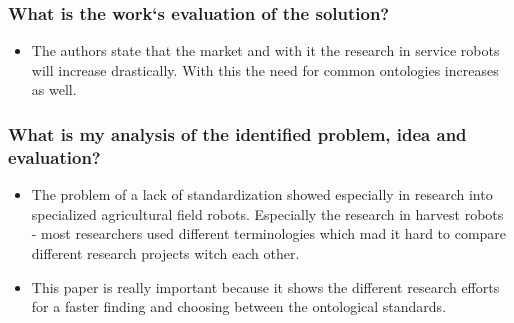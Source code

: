     \subsubsection*{What is the work`s evaluation of the solution?}
    \begin{itemize}
        \item The authors state that the market and with it the research in service robots will increase drastically. With this the need for common ontologies increases as well. 
    \end{itemize}
    \subsubsection*{What is my analysis of the identified problem, idea and evaluation?}
    \begin{itemize}
        \item The problem of a lack of standardization showed especially in research into specialized agricultural field robots. Especially the research in harvest robots - most researchers used different terminologies which mad it hard to compare different research projects witch each other.
        \item This paper is really important because it shows the different research efforts for a faster finding and choosing between the ontological standards.
    \end{itemize}
